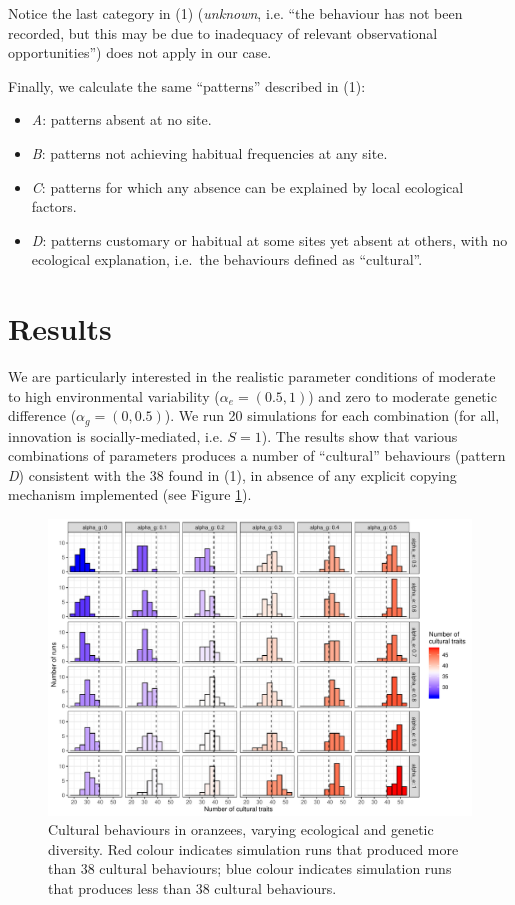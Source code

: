 \documentclass[9pt,twocolumn,twoside,]{pnas-new}
\begin{document}
Notice the last category in (1) (\emph{unknown}, i.e. ``the behaviour
has not been recorded, but this may be due to inadequacy of relevant
observational opportunities'') does not apply in our case.

Finally, we calculate the same ``patterns'' described in (1):

\begin{itemize}
\item
  \emph{A}: patterns absent at no site.
\item
  \emph{B}: patterns not achieving habitual frequencies at any site.
\item
  \emph{C}: patterns for which any absence can be explained by local
  ecological factors.
\item
  \emph{D}: patterns customary or habitual at some sites yet absent at
  others, with no ecological explanation, i.e.~the behaviours defined as
  ``cultural''.
\end{itemize}

\section*{Results}\label{results}

We are particularly interested in the realistic parameter conditions of
moderate to high environmental variability (\(\alpha_e=(0.5,1)\)) and
zero to moderate genetic difference (\(\alpha_g=(0,0.5)\)). We run 20
simulations for each combination (for all, innovation is
socially-mediated, i.e. \(S=1\)). The results show that various
combinations of parameters produces a number of ``cultural'' behaviours
(pattern \emph{D}) consistent with the 38 found in (1), in absence of
any explicit copying mechanism implemented (see Figure \ref{Figure1}).

\begin{figure}[h!]
\begin{center}
\includegraphics[width=17.8cm]{figures/figure_1.pdf}
\caption{Cultural behaviours in oranzees, varying ecological and genetic diversity. Red colour indicates simulation runs that produced more than 38 cultural behaviours; blue colour indicates simulation runs that produces less than 38 cultural behaviours.}
\label{Figure1}
\end{center}
\end{figure}
\end{document}
